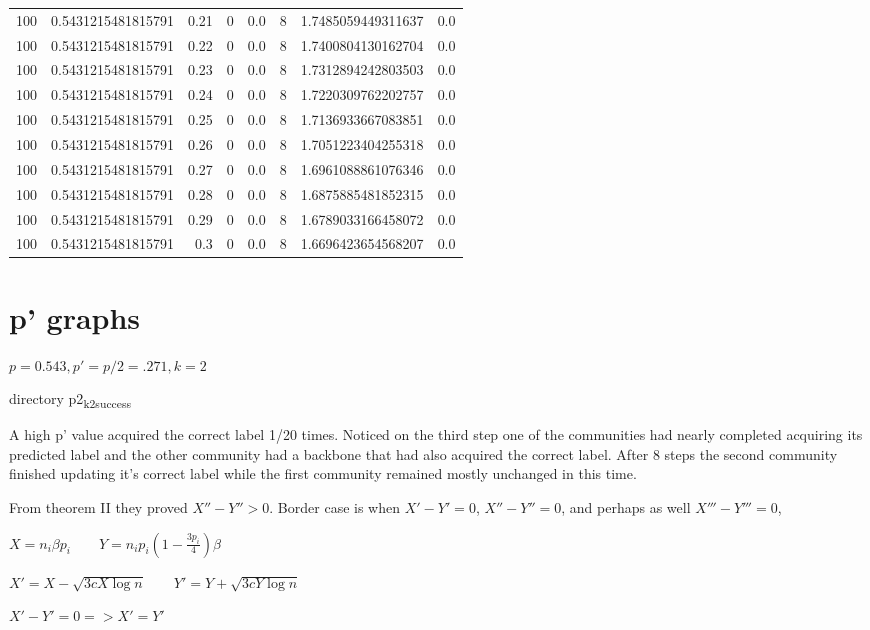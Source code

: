 \documentclass[11pt]{article}
\begin{document}
\begin{center}
\begin{tabular}{rrrrrrrr}
100 & 0.5431215481815791 & 0.21 & 0 & 0.0 & 8 & 1.7485059449311637 & 0.0\\
100 & 0.5431215481815791 & 0.22 & 0 & 0.0 & 8 & 1.7400804130162704 & 0.0\\
100 & 0.5431215481815791 & 0.23 & 0 & 0.0 & 8 & 1.7312894242803503 & 0.0\\
100 & 0.5431215481815791 & 0.24 & 0 & 0.0 & 8 & 1.7220309762202757 & 0.0\\
100 & 0.5431215481815791 & 0.25 & 0 & 0.0 & 8 & 1.7136933667083851 & 0.0\\
100 & 0.5431215481815791 & 0.26 & 0 & 0.0 & 8 & 1.7051223404255318 & 0.0\\
100 & 0.5431215481815791 & 0.27 & 0 & 0.0 & 8 & 1.6961088861076346 & 0.0\\
100 & 0.5431215481815791 & 0.28 & 0 & 0.0 & 8 & 1.6875885481852315 & 0.0\\
100 & 0.5431215481815791 & 0.29 & 0 & 0.0 & 8 & 1.6789033166458072 & 0.0\\
100 & 0.5431215481815791 & 0.3 & 0 & 0.0 & 8 & 1.6696423654568207 & 0.0\\
\end{tabular}
\end{center}

\section{p' graphs}
\label{sec:org53bb911}

\(p = 0.543, p' = p/2 = .271, k = 2\)

directory p2\textsubscript{k2}\textsubscript{success}

A high p' value acquired the correct label 1/20 times. Noticed on the third step one of the communities
had nearly completed acquiring its predicted label and the other community had a backbone that had 
also acquired the correct label. After 8 steps the second community finished updating it's correct
label while the first community remained mostly unchanged in this time.

From theorem II they proved \(X'' - Y'' > 0\). Border case is when \(X' - Y' = 0\), \(X'' - Y'' = 0\), 
and perhaps as well \(X''' - Y''' = 0\), 

\(X = n_i \beta p_i \qquad Y = n_i p_i (1 - \frac{3 p_i}{4}) \beta\)

\(X' = X - \sqrt{3 c X \log{n}} \qquad Y' = Y + \sqrt{3 c Y \log{n}}\)

\(X' - Y' = 0 => X' = Y'\)
\end{document}
